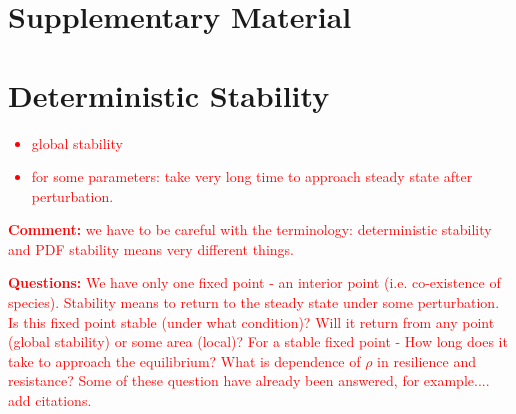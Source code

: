 \documentclass[%
 amsmath,amssymb,
 reprint,%
]{revtex4-2}
\begin{document}
\begin{widetext}

\appendix

\section*{Supplementary Material }


\section{Deterministic Stability}

\textcolor{red}{
\begin{itemize}
    \item global stability 
    \item for some parameters: take very long time to approach steady state after perturbation.    
\end{itemize}
%
{\bf Comment:} we have to be careful with the terminology: deterministic stability and PDF stability means very different things.
}

\textcolor{red}{{\bf Questions:}
We have only one fixed point - an interior point (i.e. co-existence of species). Stability means to return to the steady state under some perturbation. Is this fixed point stable (under what condition)?   Will it return from any point (global stability) or some area (local)?  For a stable fixed point - How long does it take to approach the equilibrium? What is dependence of $\rho$ in resilience and resistance?}
\textcolor{red}{Some of these question have already been answered, for example.... add citations. }


\end{widetext}
\end{document}
